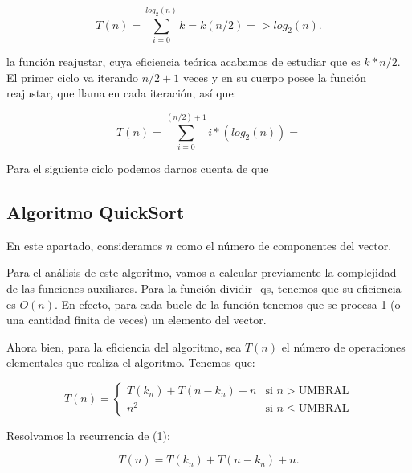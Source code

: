 \documentclass{homework}
\begin{document}
    \begin{equation*}
        T(n) = \sum_{i=0}^{log_2(n)} k = k(n/2) => log_2(n).
    \end{equation*} 


    la función reajustar, cuya eficiencia teórica acabamos de estudiar que es $k*n/2$. El primer ciclo va iterando $n/2 + 1$ veces y en su cuerpo posee la función reajustar, 
    que llama en cada iteración, así que:
    
    \begin{equation*}
        T(n) = \sum_{i=0}^{(n/2)+1} i*(log_2(n)) =  
    \end{equation*}

    Para el siguiente ciclo podemos darnos cuenta de que 

    \subsection{Algoritmo QuickSort}
    
     

    En este apartado, consideramos $n$ como el número de componentes del vector. 

    Para el análisis de este algoritmo, vamos a calcular previamente la complejidad de las funciones auxiliares. 
    Para la función dividir\_qs, tenemos que su eficiencia es $O(n)$. En efecto, para cada bucle 
    de la función tenemos que se procesa 1 (o una cantidad finita de veces) un elemento del vector. 
    
    Ahora bien, para la eficiencia del algoritmo, sea $T(n)$ el número de operaciones elementales que realiza el algoritmo. 
    Tenemos que:

    \begin{equation}
        T(n) = \left\{ \begin{array}{lr} T(k_n) + T(n-k_n) + n & \text{si } n > \text{UMBRAL}\\ n^2 & \text{si } n \leq \text{UMBRAL} \end{array} \right.
    \end{equation}

    Resolvamos la recurrencia de (1):
    
    \begin{equation}
        T(n) = T(k_n) + T(n-k_n) + n.
    \end{equation}
\end{document}
